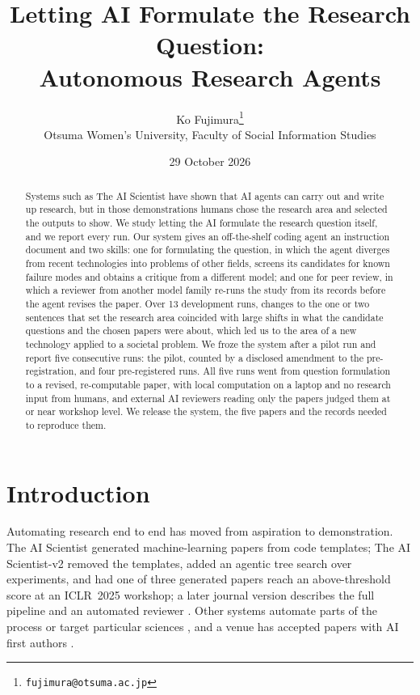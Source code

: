 \documentclass[11pt]{article}
\title{Letting AI Formulate the Research Question:\\ Autonomous Research Agents}
\author{Ko Fujimura\thanks{\texttt{fujimura@otsuma.ac.jp}}\\[2pt]
{\normalsize Otsuma Women's University, Faculty of Social Information Studies}}
\date{29 October 2026}
\begin{document}
\maketitle

\begin{abstract}
Systems such as The AI Scientist have shown that AI agents can carry out and write up research, but in those demonstrations humans chose the research area and selected the outputs to show. We study letting the AI formulate the research question itself, and we report every run. Our system gives an off-the-shelf coding agent an instruction document and two skills: one for formulating the question, in which the agent diverges from recent technologies into problems of other fields, screens its candidates for known failure modes and obtains a critique from a different model; and one for peer review, in which a reviewer from another model family re-runs the study from its records before the agent revises the paper. Over 13 development runs, changes to the one or two sentences that set the research area coincided with large shifts in what the candidate questions and the chosen papers were about, which led us to the area of a new technology applied to a societal problem. We froze the system after a pilot run and report five consecutive runs: the pilot, counted by a disclosed amendment to the pre-registration, and four pre-registered runs. All five runs went from question formulation to a revised, re-computable paper, with local computation on a laptop and no research input from humans, and external AI reviewers reading only the papers judged them at or near workshop level. We release the system, the five papers and the records needed to reproduce them.
\end{abstract}

\section{Introduction}
\label{sec:intro}

Automating research end to end has moved from aspiration to demonstration. The AI Scientist \citep{lu2024aiscientist} generated machine-learning papers from code templates; The AI Scientist-v2 \citep{yamada2025aiscientistv2} removed the templates, added an agentic tree search over experiments, and had one of three generated papers reach an above-threshold score at an ICLR~2025 workshop; a later journal version describes the full pipeline and an automated reviewer \citep{lu2026nature}. Other systems automate parts of the process or target particular sciences \citep{schmidgall2025agentlab,schmidgall2025agentrxiv,gottweis2025coscientist,mitchener2025kosmos,miyai2025jraiscientist,villaescusa2025denario}, and a venue has accepted papers with AI first authors \citep{bianchi2025agents4science}.
\end{document}
